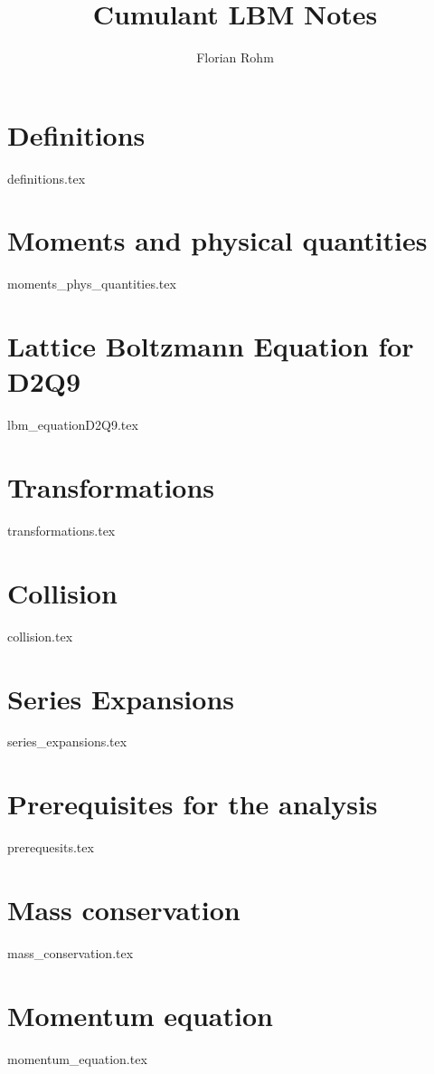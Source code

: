 \documentclass{article}
\title{Cumulant LBM Notes}
\author{Florian Rohm}
\begin{document}
\maketitle
\tableofcontents
\newpage
\listoftodos{}
\newpage

\section{Definitions}
\label{sec:Definitions}
{definitions.tex}

\section{Moments and physical quantities}
\label{sec:Moments and physical quantities}
{moments_phys_quantities.tex}

\section{Lattice Boltzmann Equation for D2Q9}
\label{sec:Lattice Boltzmann Equation for D2Q9}
{lbm_equationD2Q9.tex}

\section{Transformations}
\label{sec:Transformations}
{transformations.tex}

\section{Collision}
\label{sec:Collision}
{collision.tex}

\section{Series Expansions}
\label{sec:Series Expansions}
{series_expansions.tex}

\section{Prerequisites for the analysis}
\label{sec:Prerequisites for the analysis}
{prerequesits.tex}

\section{Mass conservation}
\label{sec:Mass conservation}
{mass_conservation.tex}

\section{Momentum equation}
\label{sec:Momentum equation}
{momentum_equation.tex}
\end{document}
